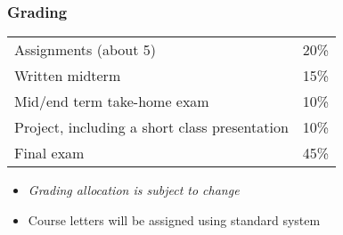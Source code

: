\begin{frame}\frametitle{Grading}
	\begin{tabular}{ll}\\
		Assignments (about 5)       	& 20\% \\
	    Written midterm        			& 15\% \\
	    Mid/end term take-home exam		& 10\% \\
	    Project, including a short class presentation& 10\% \\
	    Final exam 						& 45\% \\
	\end{tabular}
	
	\vspace{12pt}
	\vspace{12pt}
	
	\begin{itemize}
		\item	\emph{Grading allocation is subject to change}
		\item	Course letters will be assigned using standard system
	\end{itemize}
\end{frame}

